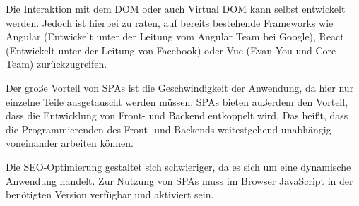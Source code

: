 Die Interaktion mit dem DOM oder auch Virtual DOM kann selbst entwickelt werden. Jedoch ist hierbei zu raten, auf bereits bestehende Frameworks wie Angular (Entwickelt unter der Leitung vom Angular Team bei Google), React (Entwickelt unter der Leitung von Facebook) oder Vue (Evan You und Core Team) zurückzugreifen. 

Der große Vorteil von SPAs ist die Geschwindigkeit der Anwendung, da hier nur einzelne Teile ausgetauscht werden müssen. SPAs bieten außerdem den Vorteil, dass die Entwicklung von Front- und Backend entkoppelt wird. Das heißt, dass die Programmierenden des Front- und Backends weitestgehend unabhängig voneinander arbeiten können.

Die SEO-Optimierung gestaltet sich schwieriger, da es sich um eine dynamische Anwendung handelt. Zur Nutzung von SPAs muss im Browser JavaScript in der benötigten Version verfügbar und aktiviert sein.

